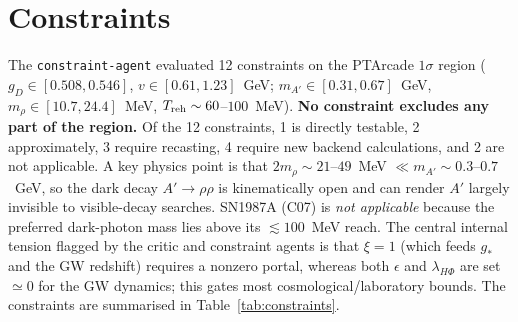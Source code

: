 \documentclass[11pt]{article}
\newcommand{\gD}{g_D}
\newcommand{\mAp}{m_{A'}}
\newcommand{\mrho}{m_\rho}
\begin{document}
\section{Constraints}
\label{sec:constraints}
The \texttt{constraint-agent} evaluated 12 constraints on the PTArcade $1\sigma$
region ($\gD\in[0.508,0.546]$, $v\in[0.61,1.23]$~GeV; $\mAp\in[0.31,0.67]$~GeV,
$\mrho\in[10.7,24.4]$~MeV, $T_{\rm reh}\sim60$--$100$~MeV).
\textbf{No constraint excludes any part of the region.} Of the 12 constraints,
1 is directly testable, 2 approximately, 3 require recasting, 4 require new
backend calculations, and 2 are not applicable. A key physics point is that
$2\mrho\sim21$--$49$~MeV $\ll\mAp\sim0.3$--$0.7$~GeV, so the dark decay
$A'\to\rho\rho$ is kinematically open and can render $A'$ largely invisible to
visible-decay searches. SN1987A (C07) is \emph{not applicable} because the
preferred dark-photon mass lies above its $\lesssim100$~MeV reach. The central
internal tension flagged by the critic and constraint agents is that $\xi=1$
(which feeds $g_*$ and the GW redshift) requires a nonzero portal, whereas both
$\epsilon$ and $\lambda_{H\Phi}$ are set $\simeq0$ for the GW dynamics; this
gates most cosmological/laboratory bounds. The constraints are summarised in
Table~\ref{tab:constraints}.
\end{document}
